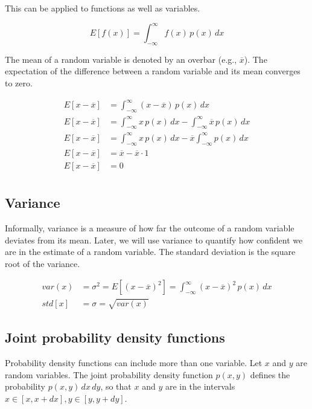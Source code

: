 This can be applied to functions as well as variables.

\begin{equation*}
  E[f(x)] = \int_{-\infty}^\infty f(x) \,p(x) \,dx
\end{equation*}

The mean of a random variable is denoted by an overbar (e.g., $\overline{x}$).
The expectation of the difference between a random variable and its mean
converges to zero.

\begin{align*}
  E[x - \overline{x}] &= \int_{-\infty}^\infty (x - \overline{x}) \,p(x) \,dx \\
  E[x - \overline{x}] &= \int_{-\infty}^\infty x \, p(x) \,dx -
    \int_{-\infty}^\infty \overline{x} \,p(x) \,dx \\
  E[x - \overline{x}] &= \int_{-\infty}^\infty x \,p(x) \,dx -
    \overline{x} \int_{-\infty}^\infty p(x) \,dx \\
  E[x - \overline{x}] &= \overline{x} - \overline{x} \cdot 1 \\
  E[x - \overline{x}] &= 0 \\
\end{align*}

\subsection{Variance}

Informally, variance is a measure of how far the outcome of a random variable
deviates from its mean. Later, we will use variance to quantify how confident we
are in the estimate of a random variable. The standard deviation is the square
root of the variance.

\begin{align*}
  var(x) &= \sigma^2 = E[(x - \overline{x})^2] =
    \int_{-\infty}^{\infty} (x - \overline{x})^2 \,p(x) \,dx \\
  std[x] &= \sigma = \sqrt{var(x)}
\end{align*}

\subsection{Joint probability density functions}

Probability density functions can include more than one variable. Let $x$ and
$y$ are random variables. The joint probability density function $p(x, y)$
defines the probability $p(x, y) \,dx \,dy$, so that $x$ and $y$ are in the
intervals $x \in [x, x + dx], y \in [y, y + dy]$.

